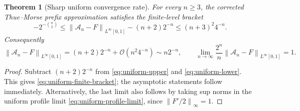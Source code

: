 \documentclass[11pt,oneside]{article}
\newtheorem{theorem}{Theorem}[section]
\theoremstyle{definition}
\theoremstyle{remark}
\newcommand{\bigO}{\mathcal O}
\newcommand{\norm}[1]{\left\lVert #1\right\rVert}
\begin{document}
\begin{theorem}[Sharp uniform convergence rate]
\label{thm:uniform-rate}
For every $n\ge3$, the corrected Thue--Morse prefix approximation satisfies the
finite-level bracket
\begin{equation}
 \boxed{\displaystyle
 -2^{-\binom n2}
 \le \norm{\mathcal A_n-F}_{L^\infty[0,1]}-(n+2)2^{-n}
 \le (n+3)^2 4^{-n}.}                                      \label{eq:uniform-finite-bracket}
\end{equation}
Consequently
\begin{equation}
 \boxed{\displaystyle
 \norm{\mathcal A_n-F}_{L^\infty[0,1]}
 =(n+2)2^{-n}+\bigO(n^2 4^{-n})
 \sim n2^{-n},
 \qquad
 \lim_{n\to\infty}\frac{2^n}{n}
 \norm{\mathcal A_n-F}_{L^\infty[0,1]}=1.}                \label{eq:uniform-rate}
\end{equation}
\end{theorem}

\begin{proof}
Subtract $(n+2)2^{-n}$ from \eqref{eq:uniform-upper} and
\eqref{eq:uniform-lower}.  This gives \eqref{eq:uniform-finite-bracket}; the
asymptotic statements follow immediately.  Alternatively, the last limit also
follows by taking sup norms in the uniform profile limit
\eqref{eq:uniform-profile-limit}, since $\norm{F'/2}_\infty=1$.
\end{proof}
\end{document}
